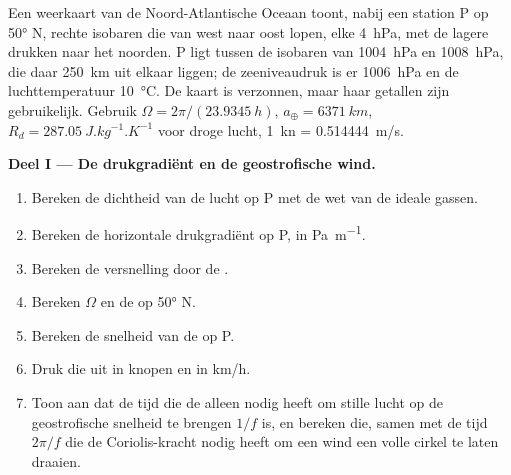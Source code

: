 \begin{problem}
\label{pb:b1:atmospheric-circulation:1}
Een weerkaart van de Noord-Atlantische Oceaan toont, nabij een station P op \ang{50} N, rechte isobaren die van west naar oost lopen, elke \qty{4}{hPa}, met de lagere drukken naar het noorden. P ligt tussen de isobaren van \qty{1004}{hPa} en \qty{1008}{hPa}, die daar \qty{250}{km} uit elkaar liggen; de zeeniveaudruk is er \qty{1006}{hPa} en de luchttemperatuur \qty{10}{\degreeCelsius}. De kaart is verzonnen, maar haar getallen zijn gebruikelijk.
Gebruik $\Omega = 2\pi/(\qty{23.9345}{h})$, $a_\oplus = \qty{6371}{km}$, $R_d =
\qty{287.05}{J.kg^{-1}.K^{-1}}$ voor droge lucht, \qty{1}{kn} = \qty{0.514444}{m/s}.

\medskip
\noindent\textbf{Deel I --- De drukgradiënt en de geostrofische wind.}
\begin{enumerate}
  \item Bereken de dichtheid van de lucht op P met de wet van de ideale gassen.
  \item Bereken de horizontale drukgradiënt op P, in \unit{Pa.m^{-1}}.
  \item Bereken de versnelling door de .
  \item Bereken $\Omega$ en de  op \ang{50} N.
  \item Bereken de snelheid van de  op P.
  \item Druk die uit in knopen en in \unit{km/h}.
  \item Toon aan dat de tijd die de  alleen nodig heeft om stille lucht op de geostrofische snelheid te brengen $1/f$ is, en bereken die, samen met
        de tijd $2\pi/f$ die de Coriolis-kracht nodig heeft om een wind een volle cirkel te laten draaien.
\end{enumerate}


\end{problem}
